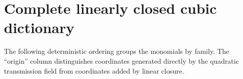 \section{Complete linearly closed cubic dictionary}
\label{app:dictionary}

The following deterministic ordering groups the monomials by family. The
``origin'' column distinguishes coordinates generated directly by the
quadratic transmission field from coordinates added by linear closure.


